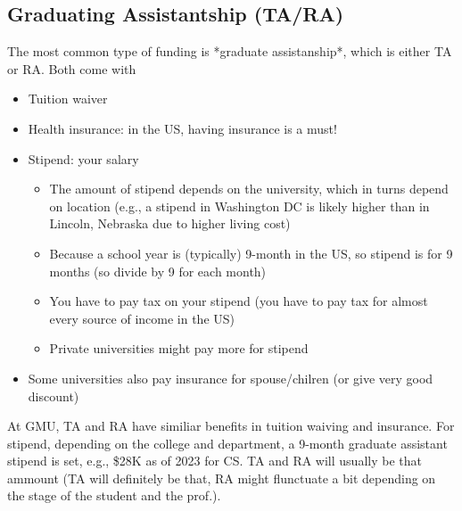 \documentclass[10pt]{article}
\begin{document}


\subsection{Graduating Assistantship (TA/RA)}
The most common type of funding is *graduate assistanship*, which is either TA or RA. Both come with
\begin{itemize}
\item Tuition waiver
\item Health insurance: in the US, having insurance is a must!
\item Stipend: your salary
  \begin{itemize}
  \item The amount of stipend depends on the university, which in turns depend on location (e.g., a stipend in Washington DC is likely higher than in Lincoln, Nebraska due to higher living cost)
  \item Because a school year is (typically) 9-month in the US, so stipend is for 9 months (so divide by 9 for each month)
  \item You have to pay tax on your stipend (you have to pay tax for almost every source of income in the US)
  \item Private universities might pay more for stipend
  \end{itemize}
\item Some universities also pay insurance for spouse/chilren (or give very good discount)
\end{itemize}

\begin{tcolorbox}[left=1pt,right=1pt,top=1pt,bottom=1pt]
At GMU, TA and RA have similiar benefits in tuition waiving and insurance.  For stipend, depending on the college and department, a 9-month graduate assistant stipend is set, e.g., \$28K as of 2023 for CS. TA and RA will usually be that ammount (TA will definitely be that, RA might flunctuate a bit depending on the stage of the student and the prof.). 
\end{tcolorbox}
\end{document}
